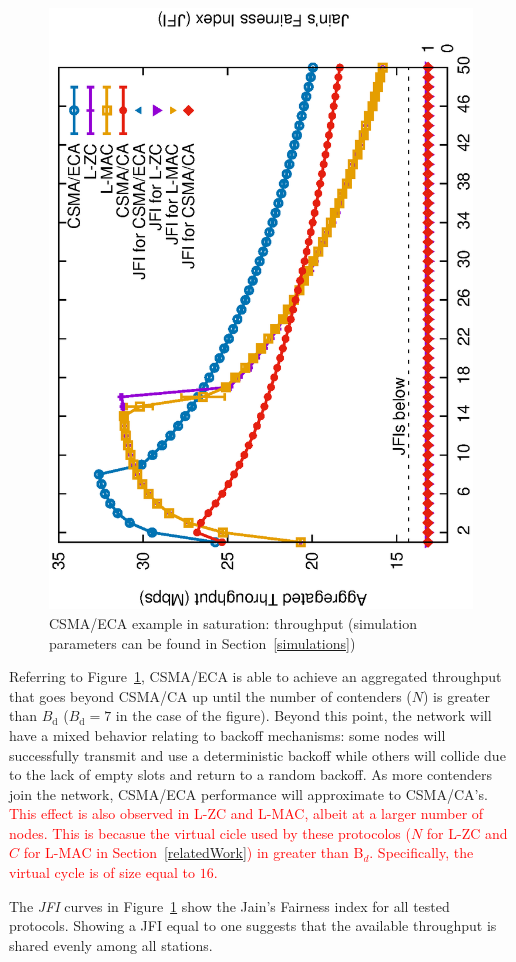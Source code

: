 \begin{figure}[tb]
\centering
  \includegraphics[width=0.7\linewidth, angle=-90]{figures/tonFigs/DCF-v-ECA-TON.eps}
  \caption{CSMA/ECA example in saturation: throughput (simulation parameters can be found in Section~\ref{simulations})}
  \label{fig:BECA}
\end{figure}

Referring to Figure~\ref{fig:BECA}, CSMA/ECA is able to achieve an aggregated throughput that goes beyond CSMA/CA up until the number of contenders ($N$) is greater than $B_{\text{d}}$ ($B_{\text{d}}=7$ in the case of the figure). Beyond this point, the network will have a mixed behavior relating to backoff mechanisms: some nodes will successfully transmit and use a deterministic backoff while others will collide due to the lack of empty slots and return to a random backoff. As more contenders join the network, CSMA/ECA performance will approximate to CSMA/CA's. \textcolor{red}{This effect is also observed in L-ZC and L-MAC, albeit at a larger number of nodes. This is becasue the virtual cicle used by these protocolos ($N$ for L-ZC and $C$ for L-MAC in Section~\ref{relatedWork}) in greater than B$_{d}$. Specifically, the virtual cycle is of size equal to $16$.}

The \emph{JFI } curves in Figure~\ref{fig:BECA} show the Jain's Fairness index for all tested protocols. Showing a JFI equal to one suggests that the available throughput is shared evenly among all stations.

